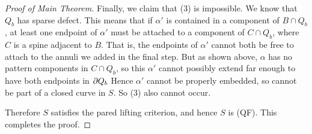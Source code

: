 \begin{proof}[Proof of Main Theorem]
Finally, we claim that (3) is impossible. We know that $Q_b$ has sparse defect.
This means that if $\alpha'$ is contained in a component of $B \cap Q_b$, at
least one endpoint of $\alpha'$ must be attached to a component of $C \cap
Q_b$, where $C$ is a spine adjacent to $B$.  That is, the endpoints of
$\alpha'$ cannot both be free to attach to the annuli we added in the final
step. But as shown above, $\alpha$ has no pattern components in $C \cap Q_b$,
so this $\alpha'$ cannot possibly extend far enough to have both endpoints in
$\partial Q_b$  Hence $\alpha'$ cannot be properly embedded, so cannot be part of
a closed curve in $S$. So (3) also cannot occur.

Therefore $S$ satisfies the pared lifting criterion, and hence $S$ is (QF).
This completes the proof.

\end{proof}
